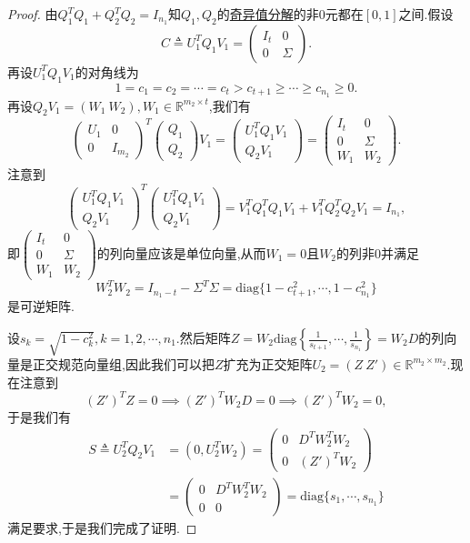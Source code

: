 \documentclass[../../main.tex]{subfiles}%
\begin{document}
\begin{proof}

由\( Q_1^T Q_1 + Q_2^T Q_2 = I_{n_1} \)知\( Q_1, Q_2 \)的\hyperref[theorem:奇异值分解]{奇异值分解}的非0元都在\([0, 1]\)之间.假设
\[
C \triangleq U_1^T Q_1 V_1 = \begin{pmatrix}
I_t & 0 \\
0 & \Sigma
\end{pmatrix}.
\]
再设\( U_1^T Q_1 V_1 \)的对角线为
\[
1 = c_1 = c_2 = \cdots = c_t > c_{t + 1} \geqslant  \cdots \geqslant  c_{n_1} \geqslant  0.
\]
再设\( Q_2 V_1 = (W_1\ W_2), W_1 \in \mathbb{R}^{m_2 \times t} \),我们有
\[
\begin{pmatrix}
U_1 & 0 \\
0 & I_{m_2}
\end{pmatrix}^T \begin{pmatrix}
Q_1 \\
Q_2
\end{pmatrix} V_1 = \begin{pmatrix}
U_1^T Q_1 V_1 \\
Q_2 V_1
\end{pmatrix} = \begin{pmatrix}
I_t & 0 \\
0 & \Sigma \\
W_1 & W_2
\end{pmatrix}.
\]
注意到
\[
\begin{pmatrix}
U_1^T Q_1 V_1 \\
Q_2 V_1
\end{pmatrix}^T \begin{pmatrix}
U_1^T Q_1 V_1 \\
Q_2 V_1
\end{pmatrix} = V_1^T Q_1^T Q_1 V_1 + V_1^T Q_2^T Q_2 V_1 = I_{n_1},
\]
即\( \begin{pmatrix}
I_t & 0 \\
0 & \Sigma \\
W_1 & W_2
\end{pmatrix} \)的列向量应该是单位向量,从而\( W_1 = 0 \)且\( W_2 \)的列非0并满足
\[
W_2^T W_2 = I_{n_1 - t} - \Sigma^T \Sigma = \text{diag}\{1 - c_{t + 1}^2, \cdots, 1 - c_{n_1}^2\}
\]
是可逆矩阵.

设\( s_k = \sqrt{1 - c_k^2}, k = 1, 2, \cdots, n_1 \).然后矩阵\( Z = W_2 \text{diag}\left\{ \frac{1}{s_{t + 1}}, \cdots, \frac{1}{s_{n_1}} \right\} = W_2 D \)的列向量是正交规范向量组,因此我们可以把\( Z \)扩充为正交矩阵\( U_2 = (Z\ Z') \in \mathbb{R}^{m_2 \times m_2} \).现在注意到
\[
(Z')^T Z = 0 \implies (Z')^T W_2 D = 0 \implies (Z')^T W_2 = 0,
\]
于是我们有
\[
\begin{aligned}
S \triangleq U_2^T Q_2 V_1 &= (0, U_2^T W_2) = \begin{pmatrix}
0 & D^T W_2^T W_2 \\
0 & (Z')^T W_2
\end{pmatrix} \\
&= \begin{pmatrix}
0 & D^T W_2^T W_2 \\
0 & 0
\end{pmatrix} = \text{diag}\{s_1, \cdots, s_{n_1}\}
\end{aligned}
\]
满足要求,于是我们完成了证明.

\end{proof}
\end{document}
